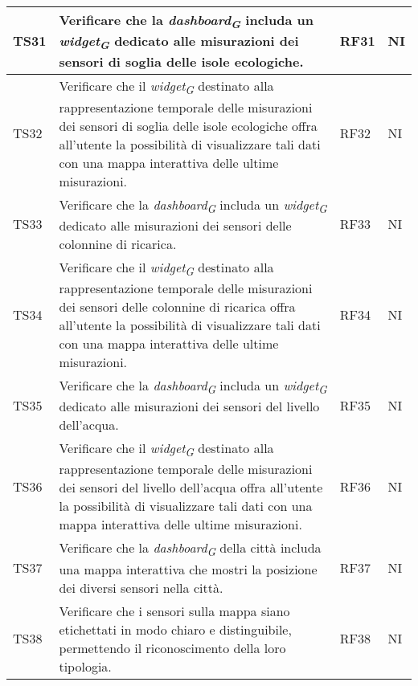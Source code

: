 \begin{longtable}{|C{1.9cm}|L{5cm}|C{2cm}|C{2cm}|}
    TS31 & Verificare che la \textit{dashboard}\textsubscript{\textit{G}} includa un \textit{widget}\textsubscript{\textit{G}} dedicato alle misurazioni dei sensori di soglia delle isole ecologiche. & RF31 & NI \\
    \hline

    TS32 & Verificare che il \textit{widget}\textsubscript{\textit{G}} destinato alla rappresentazione temporale delle misurazioni dei sensori di soglia delle isole ecologiche offra all'utente la possibilità di visualizzare tali dati con una mappa interattiva delle ultime misurazioni. & RF32 & NI \\
    \hline

    TS33 & Verificare che la \textit{dashboard}\textsubscript{\textit{G}} includa un \textit{widget}\textsubscript{\textit{G}} dedicato alle misurazioni dei sensori delle colonnine di ricarica. & RF33 & NI \\
    \hline

    TS34 & Verificare che il \textit{widget}\textsubscript{\textit{G}} destinato alla rappresentazione temporale delle misurazioni dei sensori delle colonnine di ricarica offra all'utente la possibilità di visualizzare tali dati con una mappa interattiva delle ultime misurazioni. & RF34 & NI \\
    \hline

    TS35 & Verificare che la \textit{dashboard}\textsubscript{\textit{G}} includa un \textit{widget}\textsubscript{\textit{G}} dedicato alle misurazioni dei sensori del livello dell'acqua. & RF35 & NI \\
    \hline

    TS36 & Verificare che il \textit{widget}\textsubscript{\textit{G}} destinato alla rappresentazione temporale delle misurazioni dei sensori del livello dell'acqua offra all'utente la possibilità di visualizzare tali dati con una mappa interattiva delle ultime misurazioni. & RF36 & NI \\
    \hline

    TS37 & Verificare che la \textit{dashboard}\textsubscript{\textit{G}} della città includa una mappa interattiva che mostri la posizione dei diversi sensori nella città. & RF37 & NI \\
    \hline

    TS38 & Verificare che i sensori sulla mappa siano etichettati in modo chiaro e distinguibile, permettendo il riconoscimento della loro tipologia. & RF38 & NI \\
    \hline


\end{longtable}
